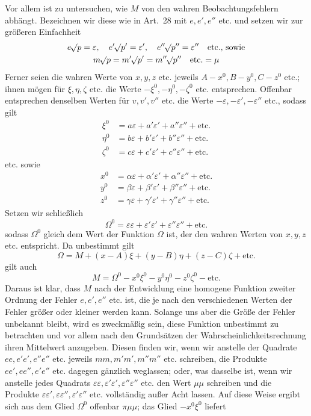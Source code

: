 Vor allem ist zu untersuchen, wie \(M\) von den wahren Beobachtungsfehlern abhängt. Bezeichnen wir diese wie in Art.\ 28 mit \(e,e',e''\) etc. und setzen wir zur größeren Einfachheit
\[
\begin{gathered}
e\mathord{{}^{}\!\surd}p=\varepsilon,\quad e'\mathord{{}^{}\!\surd}p'=\varepsilon',\quad e''\mathord{{}^{}\!\surd}p''=\varepsilon''\quad\text{etc., sowie}\\
m\mathord{{}^{}\!\surd}p=m'\mathord{{}^{}\!\surd}p'=m''\mathord{{}^{}\!\surd}p''\quad\text{etc.}=\mu
\end{gathered}
\]
Ferner seien die wahren Werte von \(x,y,z\) etc. jeweils \(A-x^0,\allowbreak B-y^0,\allowbreak C-z^0\) etc.; ihnen mögen für \(\xi,\eta,\zeta\) etc. die Werte \(-\xi^0,-\eta^0,-\zeta^0\) etc. entsprechen. Offenbar entsprechen denselben Werten für \(v,v',v''\) etc. die Werte \(-\varepsilon,-\varepsilon',-\varepsilon''\) etc., sodass gilt
\[
\begin{aligned}
\xi^0&=a\varepsilon+a'\varepsilon'+a''\varepsilon''+\text{etc.}\\
\eta^0&=b\varepsilon+b'\varepsilon'+b''\varepsilon''+\text{etc.}\\
\zeta^0&=c\varepsilon+c'\varepsilon'+c''\varepsilon''+\text{etc.}
\end{aligned}
\]
etc. sowie
\[
\begin{aligned}
x^0&=\alpha\varepsilon+\alpha'\varepsilon'+\alpha''\varepsilon''+\text{etc.}\\
y^0&=\beta\varepsilon+\beta'\varepsilon'+\beta''\varepsilon''+\text{etc.}\\
z^0&=\gamma\varepsilon+\gamma'\varepsilon'+\gamma''\varepsilon''+\text{etc.}
\end{aligned}
\]
Setzen wir schließlich
\[
\Omega^0=\varepsilon\varepsilon+\varepsilon'\varepsilon'+\varepsilon''\varepsilon''+\text{etc.}
\]
sodass \(\Omega^0\) gleich dem Wert der Funktion \(\Omega\) ist, der den wahren Werten von \(x,y,z\) etc. entspricht. Da unbestimmt gilt
\[
\Omega=M+(x-A)\xi+(y-B)\eta+(z-C)\zeta+\text{etc.}
\]
gilt auch
\[
M=\Omega^0-x^0\xi^0-y^0\eta^0-z^0\zeta^0-\text{etc.}
\]
Daraus ist klar, dass \(M\) nach der Entwicklung eine homogene Funktion zweiter Ordnung der Fehler \(e,e',e''\) etc. ist, die je nach den verschiedenen Werten der Fehler größer oder kleiner werden kann. Solange uns aber die Größe der Fehler unbekannt bleibt, wird es zweckmäßig sein, diese Funktion unbestimmt zu betrachten und vor allem nach den Grundsätzen der Wahrscheinlichkeitsrechnung ihren Mittelwert anzugeben. Diesen finden wir, wenn wir anstelle der Quadrate \(ee,e'e',e''e''\) etc. jeweils \(mm,m'm',m''m''\) etc. schreiben, die Produkte \(ee',ee'',e'e''\) etc. dagegen gänzlich weglassen; oder, was dasselbe ist, wenn wir anstelle jedes Quadrats \(\varepsilon\varepsilon,\varepsilon'\varepsilon',\varepsilon''\varepsilon''\) etc. den Wert \(\mu\mu\) schreiben und die Produkte \(\varepsilon\varepsilon',\varepsilon\varepsilon'',\varepsilon'\varepsilon''\) etc. vollständig außer Acht lassen. Auf diese Weise ergibt sich aus dem Glied \(\Omega^0\) offenbar \(\pi\mu\mu\); das Glied \(-x^0\xi^0\) liefert
